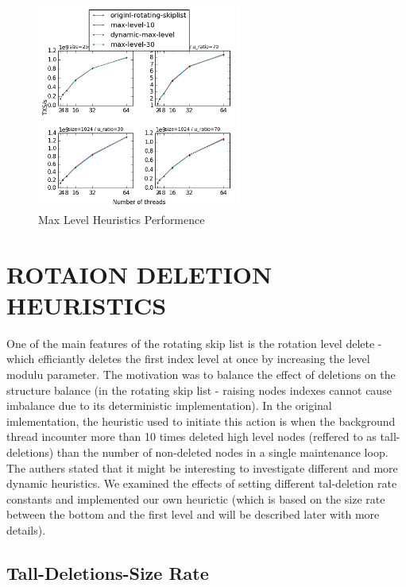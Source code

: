 \documentclass{article}
\begin{document}
\begin{figure}
	\caption{Max Level Heuristics Performence}
	\centering
	\includegraphics[width=0.6\textwidth]{max-level_plot}
\end{figure}


\section{ROTAION DELETION HEURISTICS}
\label{sec:rdh}

One of the main features of the rotating skip list is the rotation level delete - which efficiantly deletes the first index level at once by increasing the level modulu parameter. The motivation was to balance the effect of deletions on the structure balance (in the rotating skip list - raising nodes indexes cannot cause imbalance due to its deterministic implementation). In the original imlementation, the heuristic used to initiate this action is when the background thread incounter more than 10 times deleted high level nodes (reffered to as tall-deletions) than the number of non-deleted nodes in a single maintenance loop. The authers stated that it might be interesting to investigate different and more dynamic heuristics. We examined the effects of setting different tal-deletion rate constants and implemented our own heurictic (which is based on the size rate between the bottom and the first level and will be described later with more details).

\subsection{Tall-Deletions-Size Rate}
\label{ssec:tds}
\end{document}
